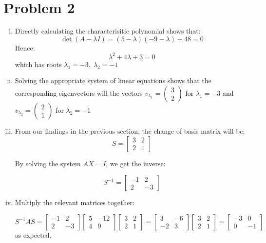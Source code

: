 \documentclass[12pt]{article}%
\begin{document}
\section*{Problem 2}
\begin{enumerate}[i.]
  \item Directly calculating the characterisitic polynomial shows that:
  \[\det(A - \lambda I) = (5-\lambda)(-9-\lambda) + 48 = 0 \]
  Hence:
  \[ \lambda^2 + 4\lambda + 3 = 0\] which has roots $\lambda_1 = -3, \; \lambda_2 = -1$

  \item Solving the appropriate system of linear equations shows that the corresponding eigenvectors will the vectors $v_{\lambda_1} = \begin{pmatrix}
    3 \\ 2
  \end{pmatrix}$ for $\lambda_1 = -3$ and $v_{\lambda_2} = \begin{pmatrix}
    2 \\ 1
  \end{pmatrix}$ for $\lambda_2 = -1$

  \item From our findings in the previous section, the change-of-basis matrix will be:
  \[ S = \begin{bmatrix}
      3 & 2 \\ 2 & 1
  \end{bmatrix} \]

  By solving the system $AX = I$, we get the inverse:

  \[ S^{-1} =\begin{bmatrix}
      -1 & 2 \\ 2 & -3
  \end{bmatrix}   \]

\item Multiply the relevant matrices together:

\[S^{-1}AS = \begin{bmatrix}
    -1 & 2 \\ 2 & -3
\end{bmatrix} \begin{bmatrix}
 5 & -12 \\ 4 & 9
\end{bmatrix} \begin{bmatrix}
    3 & 2 \\ 2 & 1
\end{bmatrix} = \begin{bmatrix}
    3 & -6 \\ -2 & 3
\end{bmatrix} \begin{bmatrix}
    3 & 2 \\ 2 & 1
\end{bmatrix}  = \begin{bmatrix}
    -3 & 0 \\ 0 & -1
\end{bmatrix}\]
as expected.
\end{enumerate}
\end{document}
